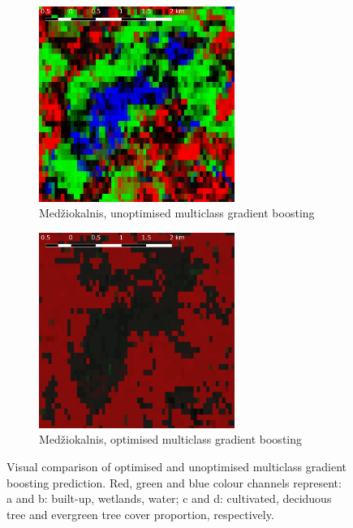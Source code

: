 \documentclass[a4paper,12pt]{scrbook}
\begin{document}
\begin{figure}
\begin{subfigure}[b]{0.48\textwidth}
    \includegraphics[width=0.7\textwidth]{thesis-figures/figures-qgis/medziokalnis-gbu}
    \caption{Med\v{z}iokalnis, unoptimised multiclass gradient boosting}
  \end{subfigure} \hfill
  \begin{subfigure}[b]{0.48\textwidth}
    \centering
    \includegraphics[width=0.7\textwidth]{thesis-figures/figures-qgis/medziokalnis-gbo}
    \caption{Med\v{z}iokalnis, optimised multiclass gradient boosting}
  \end{subfigure}
  \caption{Visual comparison of optimised and unoptimised multiclass gradient boosting prediction. Red, green and blue colour channels represent: a and b: built-up, wetlands, water; c and d: cultivated, deciduous tree and evergreen tree cover proportion, respectively.}
  \label{fig-gradientboost-comparison}
\end{figure}
\end{document}
